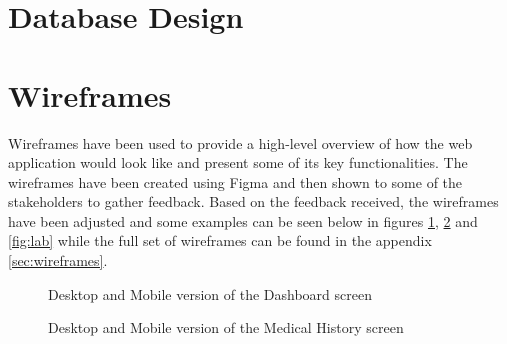 \FloatBarrier

\noindent\begin{minipage}{\textwidth}
    \section{Database Design}
    \begin{center}
        \label{fig:erd}
    \end{center}
\end{minipage}

\FloatBarrier

\section{Wireframes}

Wireframes have been used to provide a high-level overview of how the web application would look like and present some of its key functionalities. The wireframes have been created using Figma and then shown to some of the stakeholders to gather feedback. Based on the feedback received, the wireframes have been adjusted and some examples can be seen below in figures \ref{fig:dashboard}, \ref{fig:medhistory} and \ref{fig:lab} while the full set of wireframes can be found in the appendix \ref{sec:wireframes}.

\begin{figure}[ht]
    \centering
    \begin{minipage}[c]{0.70\textwidth}
    \end{minipage}
    \hspace{0.05\textwidth}
    \begin{minipage}[c]{0.20\textwidth}
    \end{minipage}
    \caption{Desktop and Mobile version of the Dashboard screen}
    \label{fig:dashboard}
\end{figure}

\begin{figure}[ht]
    \centering
    \begin{minipage}[c]{0.70\textwidth}
    \end{minipage}
    \hspace{0.05\textwidth}
    \begin{minipage}[c]{0.20\textwidth}
    \end{minipage}
    \caption{Desktop and Mobile version of the Medical History screen}
    \label{fig:medhistory}
\end{figure}

